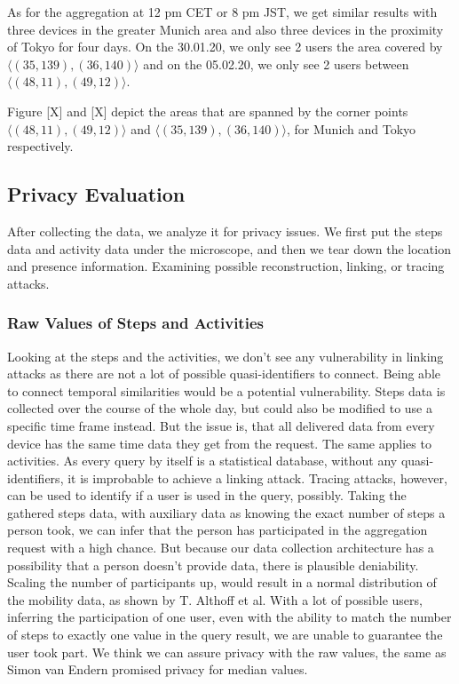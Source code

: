 As for the aggregation at 12 pm CET or 8 pm JST, we get similar results with three devices in the greater Munich area and also three devices in the proximity of Tokyo for four days. On the 30.01.20, we only see 2 users the area covered by \(\langle(35, 139),(36, 140)\rangle\) and on the 05.02.20, we only see 2 users between \(\langle(48, 11),(49, 12)\rangle\).

Figure [X] and [X] depict the areas that are spanned by the corner points \(\langle(48, 11),(49, 12)\rangle\) and \(\langle(35, 139),(36, 140)\rangle\), for Munich and Tokyo respectively. 

\subsection{Privacy Evaluation}
After collecting the data, we analyze it for privacy issues. We first put the steps data and activity data under the microscope, and then we tear down the location and presence information. Examining possible reconstruction, linking, or tracing attacks.

\subsubsection{Raw Values of Steps and Activities}
Looking at the steps and the activities, we don't see any vulnerability in linking attacks as there are not a lot of possible quasi-identifiers to connect. Being able to connect temporal similarities would be a potential vulnerability. Steps data is collected over the course of the whole day, but could also be modified to use a specific time frame instead. But the issue is, that all delivered data from every device has the same time data they get from the request. The same applies to activities. As every query by itself is a statistical database, without any quasi-identifiers, it is improbable to achieve a linking attack. 
Tracing attacks, however, can be used to identify if a user is used in the query, possibly. Taking the gathered steps data, with auxiliary data as knowing the exact number of steps a person took, we can infer that the person has participated in the aggregation request with a high chance. But because our data collection architecture has a possibility that a person doesn't provide data, there is plausible deniability. Scaling the number of participants up, would result in a normal distribution of the mobility data, as shown by T. Althoff et al. With a lot of possible users, inferring the participation of one user, even with the ability to match the number of steps to exactly one value in the query result, we are unable to guarantee the user took part. We think we can assure privacy with the raw values, the same as Simon van Endern promised privacy for median values.

